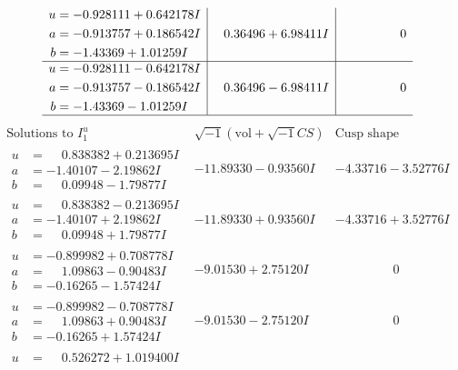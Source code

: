 \documentclass[1p]{elsarticle_modified}
\theoremstyle{definition}
\newcommand{\I}{\sqrt{-1}}
\begin{document}
$$\begin{array}{c|c|c}
\begin{aligned}
u &= -0.928111 + 0.642178 I \\
a &= -0.913757 + 0.186542 I \\
b &= -1.43369 + 1.01259 I\end{aligned}
 & \phantom{-}0.36496 + 6.98411 I & \phantom{-0.000000 } 0 \\ \hline\begin{aligned}
u &= -0.928111 - 0.642178 I \\
a &= -0.913757 - 0.186542 I \\
b &= -1.43369 - 1.01259 I\end{aligned}
 & \phantom{-}0.36496 - 6.98411 I & \phantom{-0.000000 } 0\\
 \hline 
 \end{array}$$\newpage$$\begin{array}{c|c|c}  
\text{Solutions to }I^u_{1}& \I (\text{vol} + \sqrt{-1}CS) & \text{Cusp shape}\\
 \hline 
\begin{aligned}
u &= \phantom{-}0.838382 + 0.213695 I \\
a &= -1.40107 - 2.19862 I \\
b &= \phantom{-}0.09948 - 1.79877 I\end{aligned}
 & -11.89330 - 0.93560 I & -4.33716 - 3.52776 I \\ \hline\begin{aligned}
u &= \phantom{-}0.838382 - 0.213695 I \\
a &= -1.40107 + 2.19862 I \\
b &= \phantom{-}0.09948 + 1.79877 I\end{aligned}
 & -11.89330 + 0.93560 I & -4.33716 + 3.52776 I \\ \hline\begin{aligned}
u &= -0.899982 + 0.708778 I \\
a &= \phantom{-}1.09863 - 0.90483 I \\
b &= -0.16265 - 1.57424 I\end{aligned}
 & -9.01530 + 2.75120 I & \phantom{-0.000000 } 0 \\ \hline\begin{aligned}
u &= -0.899982 - 0.708778 I \\
a &= \phantom{-}1.09863 + 0.90483 I \\
b &= -0.16265 + 1.57424 I\end{aligned}
 & -9.01530 - 2.75120 I & \phantom{-0.000000 } 0 \\ \hline\begin{aligned}
u &= \phantom{-}0.526272 + 1.019400 I \\

\end{aligned}
\end{array}$$
\end{document}
